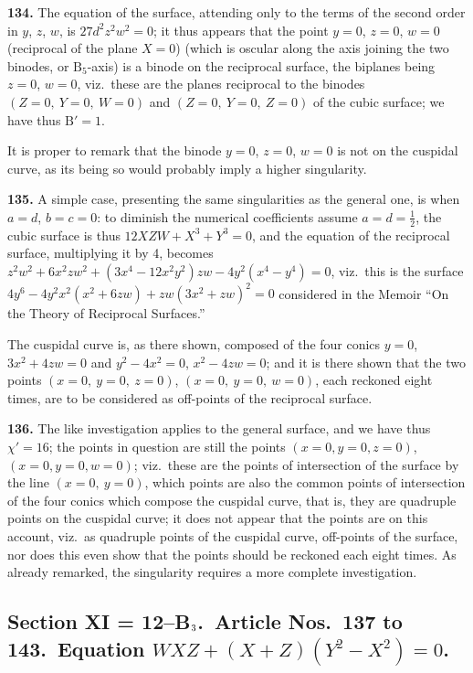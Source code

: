 \documentclass[11pt,a4paper]{article}
\theoremstyle{definition}
\begin{document}
\noindent\textbf{134.} The equation of the surface, attending only to the terms of the second order in $y$, $z$, $w$, is $27d^2z^2w^2=0$; it thus appears that the point $y=0$, $z=0$, $w=0$ (reciprocal of the plane $X=0$) (which is oscular along the axis joining the two binodes, or $\mathrm{B}_5$-axis) is a binode on the reciprocal surface, the biplanes being $z=0$, $w=0$, viz.\ these are the planes reciprocal to the binodes $(Z=0,\ Y=0,\ W=0)$ and $(Z=0,\ Y=0,\ Z=0)$ of the cubic surface; we have thus $\mathrm{B}'=1$.

It is proper to remark that the binode $y=0$, $z=0$, $w=0$ is not on the cuspidal curve, as its being so would probably imply a higher singularity.

\noindent\textbf{135.} A simple case, presenting the same singularities as the general one, is when $a=d$, $b=c=0$: to diminish the numerical coefficients assume $a=d=\frac{1}{2}$, the cubic surface is thus $12XZW+X^3+Y^3=0$, and the equation of the reciprocal surface, multiplying it by 4, becomes $z^2w^2+6x^2zw^2+(3x^4-12x^2y^2)zw-4y^2(x^4-y^4)=0$, viz.\ this is the surface $4y^6-4y^2x^2(x^2+6zw)+zw(3x^2+zw)^2=0$ considered in the Memoir ``On the Theory of Reciprocal Surfaces.''

The cuspidal curve is, as there shown, composed of the four conics $y=0$, $3x^2+4zw=0$ and $y^2-4x^2=0$, $x^2-4zw=0$; and it is there shown that the two points $(x=0,\ y=0,\ z=0)$, $(x=0,\ y=0,\ w=0)$, each reckoned eight times, are to be considered as off-points of the reciprocal surface.

\setcounter{page}{426}

\noindent\textbf{136.} The like investigation applies to the general surface, and we have thus $\chi'=16$; the points in question are still the points $(x=0,y=0,z=0)$, $(x=0,y=0,w=0)$; viz.\ these are the points of intersection of the surface by the line $(x=0,\ y=0)$, which points are also the common points of intersection of the four conics which compose the cuspidal curve, that is, they are quadruple points on the cuspidal curve; it does not appear that the points are on this account, viz.\ as quadruple points of the cuspidal curve, off-points of the surface, nor does this even show that the points should be reckoned each eight times. As already remarked, the singularity requires a more complete investigation.

\subsection*{Section XI = 12--B$_{\mbox{\scriptsize 3}}$.\ Article Nos.\ 137 to 143.\ Equation $WXZ+(X+Z)(Y^2-X^2)=0$.}
\end{document}
